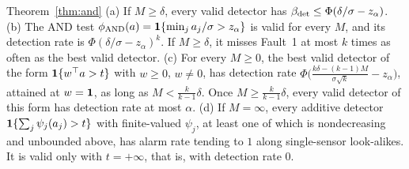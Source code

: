 \begin{restated}{Theorem~\ref{thm:and}}
(a) If $M\ge\delta$, every valid detector has $\beta_{\mathrm{det}}\le\Phi(\delta/\sigma-z_\alpha)$.
(b) The AND test $\phi_{\mathrm{AND}}(a)=\mathbf{1}\{\min_ja_j/\sigma>z_\alpha\}$ is valid for every $M$, and its detection rate is $\Phi(\delta/\sigma-z_\alpha)^k$. If $M\ge\delta$, it misses Fault~1 at most $k$ times as often as the best valid detector.
(c) For every $M\ge0$, the best valid detector of the form $\mathbf{1}\{w^\top a>t\}$ with $w\ge0$, $w\neq0$, has detection rate $\Phi\big(\frac{k\delta-(k-1)M}{\sigma\sqrt k}-z_\alpha\big)$, attained at $w=\mathbf{1}$, as long as $M<\frac{k}{k-1}\delta$. Once $M\ge\frac{k}{k-1}\delta$, every valid detector of this form has detection rate at most $\alpha$.
(d) If $M=\infty$, every additive detector $\mathbf{1}\{\sum_j\psi_j(a_j)>t\}$ with finite-valued $\psi_j$, at least one of which is nondecreasing and unbounded above, has alarm rate tending to $1$ along single-sensor look-alikes. It is valid only with $t=+\infty$, that is, with detection rate $0$.
\end{restated}


